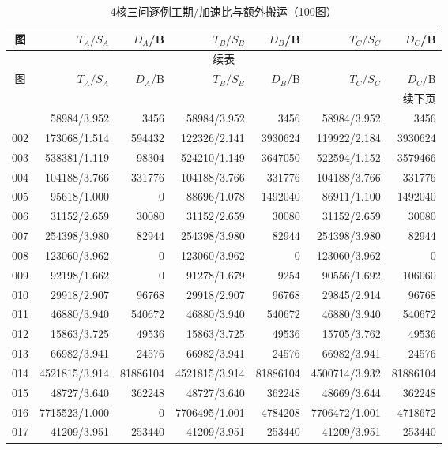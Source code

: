 \begin{longtable}{crrrrrr}
\caption{4核三问逐例工期/加速比与额外搬运（100图）}\label{tab:detail-4}\\
\toprule
图 & $T_A/S_A$ & $D_A$/B & $T_B/S_B$ & $D_B$/B & $T_C/S_C$ & $D_C$/B \\
\midrule
\endfirsthead
\multicolumn{7}{c}{续表}\\
\toprule
图 & $T_A/S_A$ & $D_A$/B & $T_B/S_B$ & $D_B$/B & $T_C/S_C$ & $D_C$/B \\
\midrule
\endhead
\midrule\multicolumn{7}{r}{续下页}\\
\endfoot
\bottomrule
\endlastfoot
001 & 58984/3.952 & 3456 & 58984/3.952 & 3456 & 58984/3.952 & 3456 \\
002 & 173068/1.514 & 594432 & 122326/2.141 & 3930624 & 119922/2.184 & 3930624 \\
003 & 538381/1.119 & 98304 & 524210/1.149 & 3647050 & 522594/1.152 & 3579466 \\
004 & 104188/3.766 & 331776 & 104188/3.766 & 331776 & 104188/3.766 & 331776 \\
005 & 95618/1.000 & 0 & 88696/1.078 & 1492040 & 86911/1.100 & 1492040 \\
006 & 31152/2.659 & 30080 & 31152/2.659 & 30080 & 31152/2.659 & 30080 \\
007 & 254398/3.980 & 82944 & 254398/3.980 & 82944 & 254398/3.980 & 82944 \\
008 & 123060/3.962 & 0 & 123060/3.962 & 0 & 123060/3.962 & 0 \\
009 & 92198/1.662 & 0 & 91278/1.679 & 9254 & 90556/1.692 & 106060 \\
010 & 29918/2.907 & 96768 & 29918/2.907 & 96768 & 29845/2.914 & 96768 \\
011 & 46880/3.940 & 540672 & 46880/3.940 & 540672 & 46880/3.940 & 540672 \\
012 & 15863/3.725 & 49536 & 15863/3.725 & 49536 & 15705/3.762 & 49536 \\
013 & 66982/3.941 & 24576 & 66982/3.941 & 24576 & 66982/3.941 & 24576 \\
014 & 4521815/3.914 & 81886104 & 4521815/3.914 & 81886104 & 4500714/3.932 & 81886104 \\
015 & 48727/3.640 & 362248 & 48727/3.640 & 362248 & 48669/3.644 & 362248 \\
016 & 7715523/1.000 & 0 & 7706495/1.001 & 4784208 & 7706472/1.001 & 4718672 \\
017 & 41209/3.951 & 253440 & 41209/3.951 & 253440 & 41209/3.951 & 253440 \\

\end{longtable}
